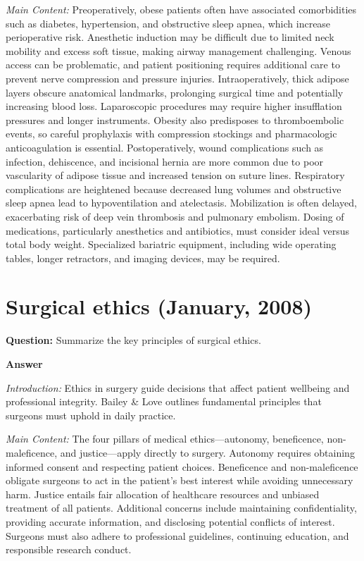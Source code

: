 \documentclass{article}
\begin{document}
\emph{Main Content:} Preoperatively, obese patients often have associated comorbidities such as diabetes, hypertension, and obstructive sleep apnea, which increase perioperative risk. Anesthetic induction may be difficult due to limited neck mobility and excess soft tissue, making airway management challenging. Venous access can be problematic, and patient positioning requires additional care to prevent nerve compression and pressure injuries. Intraoperatively, thick adipose layers obscure anatomical landmarks, prolonging surgical time and potentially increasing blood loss. Laparoscopic procedures may require higher insufflation pressures and longer instruments. Obesity also predisposes to thromboembolic events, so careful prophylaxis with compression stockings and pharmacologic anticoagulation is essential. Postoperatively, wound complications such as infection, dehiscence, and incisional hernia are more common due to poor vascularity of adipose tissue and increased tension on suture lines. Respiratory complications are heightened because decreased lung volumes and obstructive sleep apnea lead to hypoventilation and atelectasis. Mobilization is often delayed, exacerbating risk of deep vein thrombosis and pulmonary embolism. Dosing of medications, particularly anesthetics and antibiotics, must consider ideal versus total body weight. Specialized bariatric equipment, including wide operating tables, longer retractors, and imaging devices, may be required.
\section{Surgical ethics (January, 2008)}


\textbf{Question:} Summarize the key principles of surgical ethics.

\textbf{Answer}

\emph{Introduction:} Ethics in surgery guide decisions that affect patient wellbeing and professional integrity. Bailey \& Love outlines fundamental principles that surgeons must uphold in daily practice.

\emph{Main Content:} The four pillars of medical ethics—autonomy, beneficence, non-maleficence, and justice—apply directly to surgery. Autonomy requires obtaining informed consent and respecting patient choices. Beneficence and non-maleficence obligate surgeons to act in the patient's best interest while avoiding unnecessary harm. Justice entails fair allocation of healthcare resources and unbiased treatment of all patients. Additional concerns include maintaining confidentiality, providing accurate information, and disclosing potential conflicts of interest. Surgeons must also adhere to professional guidelines, continuing education, and responsible research conduct.
\end{document}
